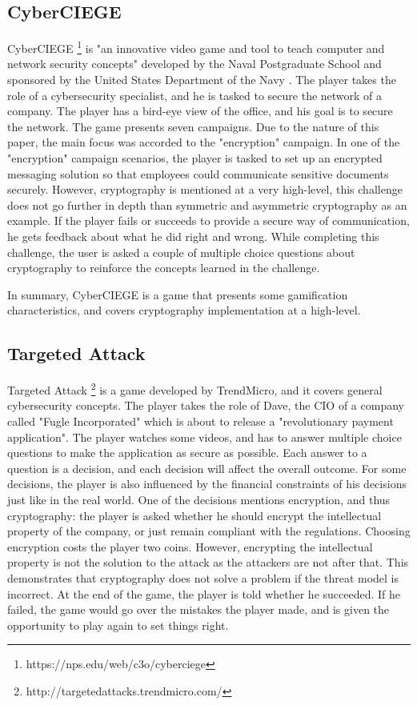 \documentclass{l4proj}
\begin{document}
\subsection{CyberCIEGE}

CyberCIEGE \footnote{https://nps.edu/web/c3o/cyberciege} is "an innovative video game and tool to teach computer and network security concepts" developed by the Naval Postgraduate School and 
sponsored by the United States Department of the Navy \citep{noauthor_cyberciege_nodate}. The player takes the role of a cybersecurity specialist, 
and he is tasked to secure the network of a company. The player has a bird-eye view of the office, and his goal is to secure the network.
The game presents seven campaigns. Due to the nature of this paper, the main focus was accorded to the "encryption" campaign.
In one of the "encryption" campaign scenarios, the player is tasked to set up an encrypted messaging solution so that employees could communicate sensitive documents securely.
However, cryptography is mentioned at a very high-level, this challenge does not go further in depth than symmetric and asymmetric cryptography as an example.
If the player fails or succeeds to provide a secure way of communication, he gets feedback about what he did right and wrong.
While completing this challenge, the user is asked a couple of multiple choice questions about cryptography to reinforce the concepts learned in the challenge.

In summary, CyberCIEGE is a game that presents some gamification characteristics, and covers cryptography implementation at a high-level.

\subsection{Targeted Attack}

Targeted Attack \footnote{http://targetedattacks.trendmicro.com/} is a game developed by TrendMicro, and it covers general cybersecurity concepts.
The player takes the role of Dave, the CIO of a company called "Fugle Incorporated" which is about to release a "revolutionary payment application".
The player watches some videos, and has to answer multiple choice questions to make the application as secure as possible. 
Each answer to a question is a decision, and each decision will affect the overall outcome. 
For some decisions, the player is also influenced by the financial constraints of his decisions just like in the real world.
One of the decisions mentions encryption, and thus cryptography: the player is asked whether he should encrypt the intellectual property of the company, 
or just remain compliant with the regulations. Choosing encryption costs the player two coins. 
However, encrypting the intellectual property is not the solution to the attack as the attackers are not after that.
This demonstrates that cryptography does not solve a problem if the threat model is incorrect.
At the end of the game, the player is told whether he succeeded. If he failed, the game would go over the mistakes the player made, 
and is given the opportunity to play again to set things right.
\end{document}

